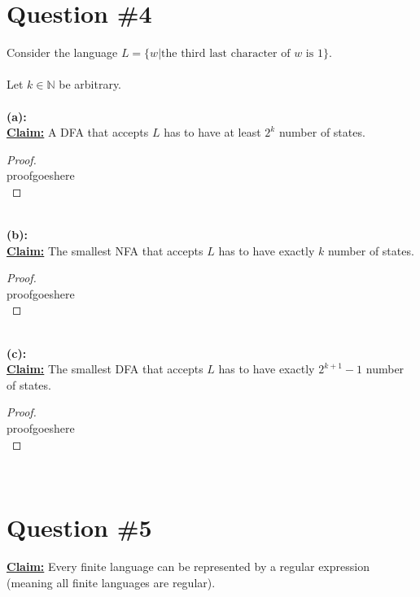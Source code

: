 \documentclass[12pt]{article}
\begin{document}
\section*{Question \#4}
Consider the language $L = \{ w | \text{the third last character of $w$ is $1$} \} $. \\
\\
Let $k \in \mathbb{N}$ be arbitrary. \\
\\
\textbf{(a):} \\
\textbf{\underline{Claim:}} A DFA that accepts $L$ has to have at least $2^k$ number of states.
\begin{proof}
\leavevmode\\
    proofgoeshere \\
\end{proof}
\leavevmode\\
\textbf{(b):} \\
\textbf{\underline{Claim:}} The smallest NFA that accepts $L$ has to have exactly $k$ number of states.
\begin{proof}
\leavevmode\\
    proofgoeshere \\
\end{proof}
\leavevmode\\
\textbf{(c):} \\
\textbf{\underline{Claim:}} The smallest DFA that accepts $L$ has to have exactly $2^{k + 1} - 1$ number of states.
\begin{proof}
\leavevmode\\
    proofgoeshere \\
\end{proof}
\leavevmode\\
\pagebreak

\section*{Question \#5}
\textbf{\underline{Claim:}} Every finite language can be represented by a regular expression (meaning all finite languages are regular).
\end{document}

